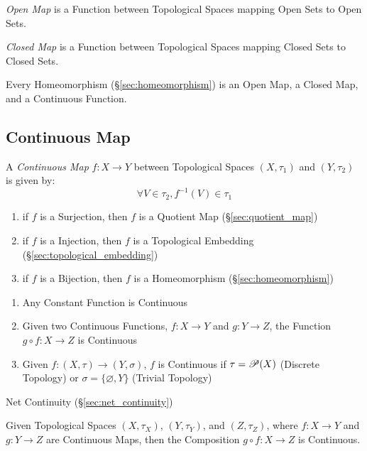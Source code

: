 \emph{Open Map} is a Function between Topological Spaces mapping Open
Sets to Open Sets.

\emph{Closed Map} is a Function between Topological Spaces mapping Closed
Sets to Closed Sets.

Every Homeomorphism (\S\ref{sec:homeomorphism}) is an Open Map, a
Closed Map, and a Continuous Function.



\subsection{Continuous Map}\label{sec:continuous_map}

A \emph{Continuous Map} $f : X \rightarrow Y$ between Topological
Spaces $(X,\tau_1)$ and $(Y,\tau_2)$ is given by:
\[
  \forall V \in \tau_2, f^{-1}(V) \in \tau_1
\]

\begin{enumerate}
  \item if $f$ is a Surjection, then $f$ is a Quotient Map
    (\S\ref{sec:quotient_map})
  \item if $f$ is a Injection, then $f$ is a Topological Embedding
    (\S\ref{sec:topological_embedding})
  \item if $f$ is a Bijection, then $f$ is a Homeomorphism
    (\S\ref{sec:homeomorphism})
\end{enumerate}

\begin{enumerate}
  \item Any Constant Function is Continuous
  \item Given two Continuous Functions, $f : X \rightarrow Y$ and $g
    : Y \rightarrow Z$, the Function $g \circ f : X \rightarrow Z$ is
    Continuous
  \item Given $f : (X, \tau) \rightarrow (Y, \sigma)$, $f$ is
    Continuous if $\tau = \mathscr{P}(X)$ (Discrete Topology) or
    $\sigma = \{\varnothing, Y\}$ (Trivial Topology)
\end{enumerate}

Net Continuity (\S\ref{sec:net_continuity})

Given Topological Spaces $(X, \tau_X)$, $(Y, \tau_Y)$, and $(Z,
\tau_Z)$, where $f: X \rightarrow Y$ and $g: Y \rightarrow Z$ are
Continuous Maps, then the Composition $g \circ f : X \rightarrow Z$ is
Continuous.

